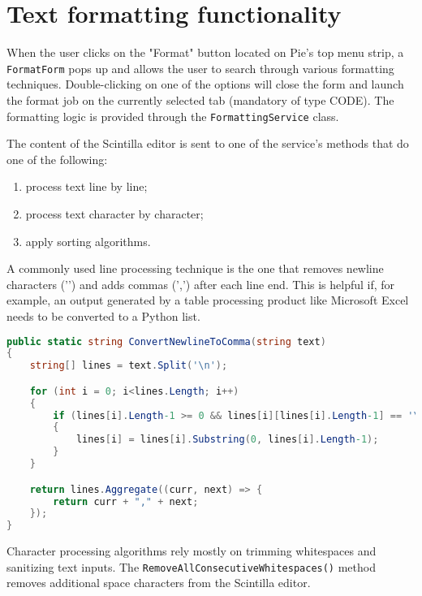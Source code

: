 \section{Text formatting functionality}

When the user clicks on the "Format" button located on Pie's top menu strip, a \texttt{FormatForm} pops up and allows the user to search through various formatting techniques. Double-clicking on one of the options will close the form and launch the format job on the currently selected tab (mandatory of type CODE). The formatting logic is provided through the \texttt{FormattingService} class.

The content of the Scintilla editor is sent to one of the service's methods that do one of the following:

\begin{enumerate}
  \item process text line by line;
  \item process text character by character;
  \item apply sorting algorithms.
\end{enumerate}

A commonly used line processing technique is the one that removes newline characters ('\n') and adds commas (',') after each line end. This is helpful if, for example, an output generated by a table processing product like Microsoft Excel needs to be converted to a Python list.

\begin{lstlisting}[language=csharp, caption={Converting newline to commas using the ConvertNewlineToComma() method from the FormattingService class}]
public static string ConvertNewlineToComma(string text)
{
    string[] lines = text.Split('\n');

    for (int i = 0; i<lines.Length; i++)
    {
        if (lines[i].Length-1 >= 0 && lines[i][lines[i].Length-1] == '\r')
        {
            lines[i] = lines[i].Substring(0, lines[i].Length-1);
        }
    }

    return lines.Aggregate((curr, next) => {
        return curr + "," + next;
    });
}
\end{lstlisting}

Character processing algorithms rely mostly on trimming whitespaces and sanitizing text inputs. The \texttt{RemoveAllConsecutiveWhitespaces()} method removes additional space characters from the Scintilla editor.

